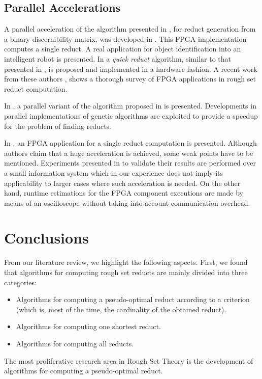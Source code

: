 \documentclass[citenumber]{llncs}
\begin{document}
  \subsection{Parallel Accelerations}
  
    A parallel acceleration of the algorithm presented in \cite{Yang08}, for reduct generation from a binary
    discernibility matrix, was developed in \cite{Tiwari11,Tiwari12}. This FPGA implementation computes a 
    single reduct. A real application for object identification into an intelligent robot is presented.
    In \cite{Tiwari13} a \emph{quick reduct} algorithm, similar to that presented in \cite{Chouchoulas01}, 
    is proposed and implemented in a hardware fashion. A recent work from these authors \cite{Tiwari14}, 
    shows a thorough survey of FPGA applications in rough set reduct computation.
 
    In \cite{Wroblewski98}, a parallel variant of the algorithm proposed in \cite{Wroblewski95} is presented.
    Developments in parallel implementations of genetic algorithms are exploited to provide a speedup for the 
    problem of finding reducts.
    
    In \cite{Grzes13,Kopczynski14}, an FPGA application for a single reduct computation is presented. Although
    authors claim that a huge acceleration is achieved, some weak points have to be mentioned. Experiments presented 
    in \cite{Kopczynski14} to validate their results are performed over a small information system which in our experience 
    does not imply its applicability to larger cases where such acceleration is needed. On the other hand, 
    runtime estimations for the FPGA component executions are made by means of an oscilloscope without taking into 
    account communication overhead.
    
\section{Conclusions}\label{conclusions}
   From our literature review, we highlight the following aspects. First, we found that algorithms for computing rough set reducts are mainly divided into three categories:
    \begin{itemize}
  	  \item Algorithms for computing a pseudo-optimal reduct according to a criterion (which is, most of the 
  	  		time, the cardinality of the obtained reduct).
  	  \item Algorithms for computing one shortest reduct.
  	  \item Algorithms for computing all reducts.
    \end{itemize}
    The most proliferative research area in Rough Set Theory is the development of algorithms for computing a 
    pseudo-optimal reduct. 
    
\end{document}
